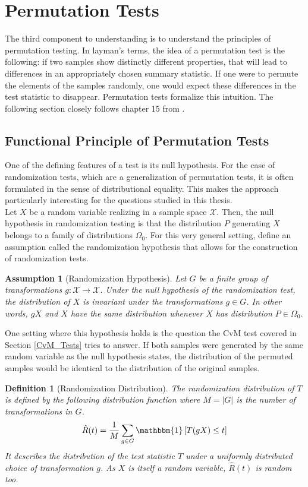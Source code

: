 \documentclass[12pt, a4paper]{article}
\theoremstyle{MAstyle} \newtheorem{assumption}{Assumption}[section]
\theoremstyle{MAstyle} \newtheorem{definition}{Definition}[section]
\theoremstyle{MAstyle} \newtheorem{theorem}{Theorem}[section]
\begin{document}
	\section{Permutation Tests}\label{Permutation_Tests}
		The third component to understanding \cite{bugni_permutation_2021} is to understand the principles of permutation testing.
		In layman's terms, the idea of a permutation test is the following: if two samples show distinctly different properties, that will lead to differences in an appropriately chosen summary statistic. If one were to permute the elements of the samples randomly, one would expect these differences in the test statistic to disappear.
		Permutation tests formalize this intuition. The following section closely follows chapter 15 from \cite{lehmann_testing_2005}.
	
		\subsection{Functional Principle of Permutation Tests}\label{perm_tests}
			One of the defining features of a test is its null hypothesis. For the case of randomization tests, which are a generalization of permutation tests, it is often formulated in the sense of distributional equality.  This makes the approach particularly interesting for the questions studied in this thesis. \\
						
			Let $X$ be a random variable realizing in a sample space $\mathcal{X}$. Then, the null hypothesis in randomization testing is that the distribution $P$ generating $X$ belongs to a family of distributions $\Omega_0$. For this very general setting, \cite{lehmann_testing_2005} define an assumption called the randomization hypothesis that allows for the construction of randomization tests.
			
			\begin{assumption}[Randomization Hypothesis]\label{rand_hypo}
				 Let $G$ be a finite group of transformations $g: \mathcal{X} \rightarrow \mathcal{X}$. Under the null hypothesis of the randomization test, the distribution of $X$ is invariant under the transformations $g \in G$. In other words, $gX$ and $X$ have the same distribution whenever $X$ has distribution $P \in \Omega_0$.
			\end{assumption}
			One setting where this hypothesis holds is the question the CvM test covered in Section \ref{CvM_Tests} tries to answer. If both samples were generated by the same random variable as the null hypothesis states, the distribution of the permuted samples would be identical to the distribution of the original samples.
			\begin{definition}[Randomization Distribution]\label{rand_dist}
				The randomization distribution of $T$ is defined by the following distribution function where $M = \vert G \vert$ is the number of transformations in $G$.
				$$\hat{R}(t) = \frac{1}{M} \sum_{g \in G} \mathbbm{1} \left[T(gX) \leq t\right]$$
				It describes the distribution of the test statistic $T$ under a uniformly distributed choice of transformation $g$. As $X$ is itself a random variable, $\hat{R}(t)$ is random too.
			\end{definition}
			
\end{document}

